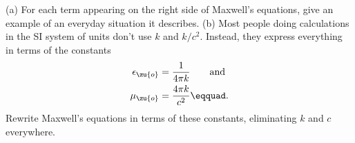 (a) For each term appearing on the right side of Maxwell's equations, give
        an example of an everyday situation it describes.\hwendpart
        (b) Most people doing calculations in the SI system of units don't use
        $k$ and $k/c^2$. Instead, they express everything in terms of
        the constants
        \begin{align*}
                \epsilon_\zu{o}&=\frac{1}{4\pi k} \qquad \text{and} \\
                 \mu_\zu{o}&=\frac{4\pi k}{c^2}\eqquad.
        \end{align*}
        Rewrite Maxwell's equations in terms of these constants, eliminating
        $k$ and $c$ everywhere.
